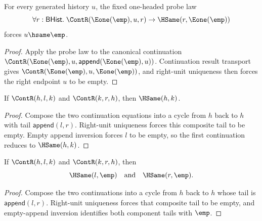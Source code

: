 \begin{theorem}
\label{thm:cont-e1-right-unit-probe-forces-empty}
For every generated history $u$, the fixed one-headed probe law
$$
\forall r:\mathsf{BHist}.\;
\ContR(\Eone(\emp),u,r)\to \HSame(r,\Eone(\emp))
$$
forces $u\hsame\emp$.
\end{theorem}
\begin{proof}
Apply the probe law to the canonical continuation
$\ContR(\Eone(\emp),u,\mathsf{append}(\Eone(\emp),u))$. Continuation result
transport gives $\ContR(\Eone(\emp),u,\Eone(\emp))$, and right-unit uniqueness
then forces the right endpoint $u$ to be empty.
\end{proof}

\begin{theorem}
\label{thm:cont-mutual-extension-hsame}
If \(\ContR(h,l,k)\) and \(\ContR(k,r,h)\), then \(\HSame(h,k)\).
\end{theorem}
\begin{proof}
Compose the two continuation equations into a cycle from $h$ back to $h$ with tail $\mathsf{append}(l,r)$. Right-unit uniqueness forces this composite tail to be empty. Empty append inversion forces $l$ to be empty, so the first continuation reduces to $\HSame(h,k)$.
\end{proof}

\begin{theorem}
\label{thm:cont-mutual-extension-tails-empty}
If $\ContR(h,l,k)$ and $\ContR(k,r,h)$, then
$$
\HSame(l,\emp)
\quad\text{and}\quad
\HSame(r,\emp).
$$
\end{theorem}
\begin{proof}
Compose the two continuations into a cycle from $h$ back to $h$ whose tail is
$\mathsf{append}(l,r)$. Right-unit uniqueness forces that composite tail to be
empty, and empty-append inversion identifies both component tails with
$\emp$.
\end{proof}

